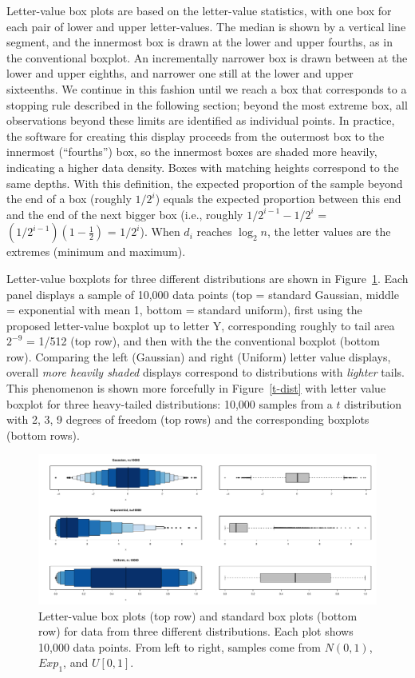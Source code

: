 \documentclass[oneside]{article}
\begin{document}
Letter-value box plots are based on the letter-value statistics, with one box for each pair of lower and upper letter-values. The median is shown by a vertical line segment, and the innermost box is drawn at the lower and upper fourths, as in the conventional boxplot. An incrementally narrower box is drawn between at the lower and upper eighths, and narrower one still at the lower and upper sixteenths. We continue in this fashion until we reach a box that corresponds to a stopping rule described in the following section; beyond the most extreme box, all observations beyond these limits are identified as individual points. In practice, the software for creating this display proceeds from the outermost box to the innermost (``fourths'') box, so the innermost boxes are shaded more heavily, indicating a higher data density. Boxes with matching heights correspond to the same depths. With this definition, the expected proportion of the sample beyond the end of a box (roughly $1/2^i$) equals the expected proportion between this end and the end of the next bigger box (i.e., roughly $1/2^{i-1} - 1/2^i$ = $(1/2^{i-1})(1 - \frac{1}{2})$ = $1 / 2^i$). When $d_i$ reaches $\log_2 n$, the letter values are the extremes (minimum and maximum).

Letter-value boxplots for three different distributions are shown in Figure~\ref{stackbox}. Each panel displays a sample of 10,000 data points (top = standard Gaussian, middle = exponential with mean 1, bottom = standard uniform), first using the proposed letter-value boxplot up to letter Y, corresponding roughly to tail area $2^{-9}$ = 1/512 (top row), and then with the the conventional boxplot (bottom row). Comparing the left (Gaussian) and right (Uniform) letter value displays, overall \textit{more heavily shaded} displays correspond to distributions with \textit{lighter} tails. This phenomenon is shown more forcefully in Figure~\ref{t-dist} with letter value boxplot for three heavy-tailed distributions: 10,000 samples from a $t$ distribution with 2, 3, 9 degrees of freedom (top rows) and the corresponding boxplots (bottom rows).

\begin{figure}[hbtp]
  \centering
  \includegraphics[width = \linewidth]{boxplots}

  \caption{Letter-value box plots (top row) and standard box plots (bottom
  row) for data from three different distributions. Each plot shows 10,000
  data points. From left to right, samples come from $N(0,1)$, $Exp_1$, and
  $U[0,1]$. }
  \label{stackbox}
\end{figure}
\end{document}
